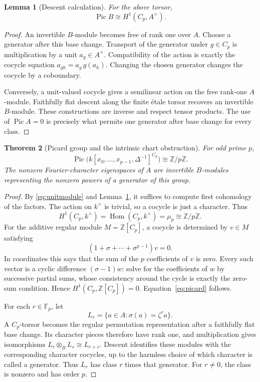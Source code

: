 \documentclass[11pt,a4paper]{article}
\newtheorem{theorem}{Theorem}[section]
\newtheorem{lemma}[theorem]{Lemma}
\theoremstyle{definition}
\theoremstyle{remark}
\newcommand{\Z}{\mathbb Z}
\newcommand{\F}{\mathbb F}
\newcommand{\Pic}{\operatorname{Pic}}
\begin{document}
\begin{lemma}[Descent calculation]\label{lem:descent}
For the above torsor,
\[
 \Pic B\cong H^1(C_p,A^\times).
\]
\end{lemma}
\begin{proof}
An invertible $B$-module becomes free of rank one over $A$.
Choose a generator after this base change. Transport of the generator
under $g\in C_p$ is multiplication by a unit $a_g\in A^\times$.
Compatibility of the action is exactly the cocycle equation
$a_{gh}=a_g\,g(a_h)$. Changing the chosen generator changes the cocycle
by a coboundary.

Conversely, a unit-valued cocycle gives a semilinear action on the free
rank-one $A$-module. Faithfully flat descent along the finite \'etale torsor
recovers an invertible $B$-module. These constructions are inverse and
respect tensor products. The use of $\Pic A=0$ is precisely what permits
one generator after base change for every class.
\end{proof}

\begin{theorem}[Picard group and the intrinsic chart obstruction]\label{thm:picard}
For odd prime $p$,
\begin{equation}
 \Pic\bigl(k[x_0,\ldots,x_{p-1},\Delta^{-1}]^{C_p}\bigr)
 \cong\Z/p\Z.
 \label{eq:picard}
\end{equation}
The nonzero Fourier-character eigenspaces of $A$ are invertible
$B$-modules representing the nonzero powers of a generator of this group.
\end{theorem}
\begin{proof}
By \eqref{eq:unitmodule} and Lemma~\ref{lem:descent}, it suffices to
compute first cohomology of the factors. The action on $k^\times$ is
trivial, so a cocycle is just a character. Thus
\[
 H^1(C_p,k^\times)=\operatorname{Hom}(C_p,k^\times)=\mu_p\cong\Z/p\Z.
\]
For the additive regular module $M=\Z[C_p]$, a cocycle is determined by
$v\in M$ satisfying
\[
 (1+\sigma+\cdots+\sigma^{p-1})v=0.
\]
In coordinates this says that the sum of the $p$ coefficients of $v$ is
zero. Every such vector is a cyclic difference $(\sigma-1)w$: solve for
the coefficients of $w$ by successive partial sums, whose consistency
around the cycle is exactly the zero-sum condition. Hence
$H^1(C_p,\Z[C_p])=0$. Equation~\eqref{eq:picard} follows.

For each $r\in\F_p$, let
\[
 L_r=\{a\in A:\sigma(a)=\zeta^r a\}.
\]
A $C_p$-torsor becomes the regular permutation representation after a
faithfully flat base change. Its character pieces therefore have rank
one, and multiplication gives isomorphisms
$L_r\otimes_B L_s\cong L_{r+s}$. Descent identifies these modules with
the corresponding character cocycles, up to the harmless choice of which
character is called a generator. Thus $L_r$ has class $r$ times that
generator. For $r\neq0$, the class is nonzero and has order $p$.
\end{proof}
\end{document}

